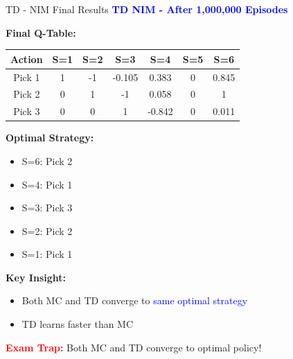 \documentclass[8pt]{beamer}
\begin{document}
	\begin{frame}{TD - NIM Final Results}
		\fontsize{6.5}{7.5}\selectfont
		\textcolor{blue}{\textbf{TD NIM - After 1,000,000 Episodes}}
		
		\textbf{Final Q-Table:}
		\begin{tabular}{|c|c|c|c|c|c|c|}
			\hline
			Action & S=1 & S=2 & S=3 & S=4 & S=5 & S=6 \\
			\hline
			Pick 1 & 1 & -1 & -0.105 & 0.383 & 0 & 0.845 \\
			\hline
			Pick 2 & 0 & 1 & -1 & 0.058 & 0 & 1 \\
			\hline
			Pick 3 & 0 & 0 & 1 & -0.842 & 0 & 0.011 \\
			\hline
		\end{tabular}
		
		\textbf{Optimal Strategy:}
		\begin{itemize}
			\item S=6: Pick 2
			\item S=4: Pick 1
			\item S=3: Pick 3
			\item S=2: Pick 2
			\item S=1: Pick 1
		\end{itemize}
		
		\textbf{Key Insight:}
		\begin{itemize}
			\item Both MC and TD converge to \textcolor{blue}{same optimal strategy}
			\item TD learns faster than MC
		\end{itemize}
		
		\textcolor{red}{\textbf{Exam Trap:}} Both MC and TD converge to optimal policy!
	\end{frame}
	
\end{document}
